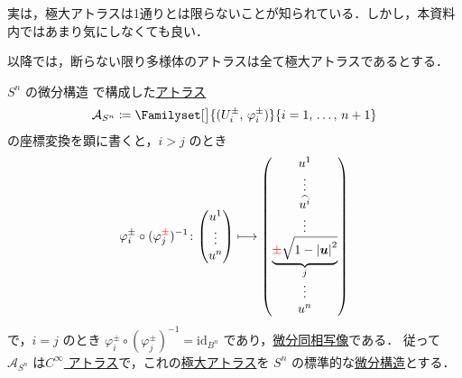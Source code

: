 \documentclass[geometry_main]{subfiles}
\begin{document}
\begin{marker}
	実は，極大アトラスは1通りとは限らないことが知られている．しかし，本資料内ではあまり気にしなくても良い．
\end{marker}

以降では，断らない限り多様体のアトラスは全て極大アトラスであるとする．

\begin{myexample}[label=ex:diffmani-n-sphere]{$S^n$ の微分構造}
	で構成した\hyperref[def.atlas]{アトラス}
	\begin{align}
		\mathcal{A}_{S^n} \coloneqq \Familyset[\big]{(U_i^{\pm},\, \varphi_i^{\pm})}{i=1,\, \dots,\, n+1}
	\end{align}
	の座標変換を顕に書くと，$i > j$ のとき
	\begin{align}
		\varphi_i^{\pm} \circ (\varphi_j^{\textcolor{red}{\pm}})^{-1} \colon \mqty(u^1 \\ \vdots \\ u^n) \lmto \mqty(u^1 \\ \vdots \\ \widehat{u^i} \\ \vdots \\ \underbrace{\textcolor{red}{\pm} \sqrt{1- \abs{\bm{u}}^2}}_{j} \\ \vdots \\ u^n)
	\end{align}
	で，$i=j$ のとき $\varphi_i^{\pm} \circ (\varphi_j^{\pm})^{-1} = \mathrm{id}_{B^n}$ であり，\hyperref[def.diffeomo]{微分同相写像}である．
	従って $\mathcal{A}_{S^n}$ は\hyperref[diffmani]{$C^\infty$ アトラス}で，これの\hyperref[maxatlas]{極大アトラス}を $S^n$ の標準的な\hyperref[maxatlas]{微分構造}とする．
\end{myexample}
\end{document}
